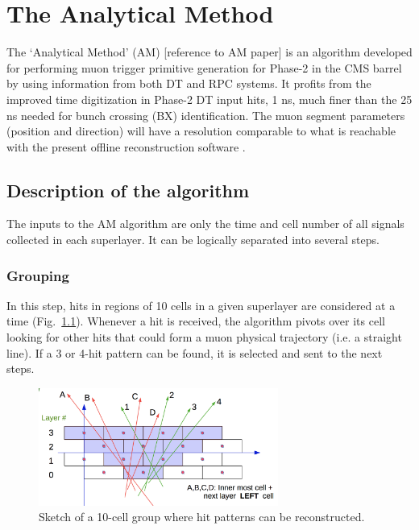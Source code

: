 \documentclass[../main.tex]{subfiles}
\begin{document}
\chapter{The Analytical Method}


The `Analytical Method' (AM) [reference to AM paper] is an algorithm developed for performing muon trigger primitive generation for Phase-2 in the CMS barrel by using information from both DT and RPC systems. It profits from the improved time digitization in Phase-2 DT input hits, 1 ns, much finer than the 25 ns needed for bunch crossing (BX) identification. The muon segment parameters (position and direction) will have a resolution comparable to what is reachable with the present offline reconstruction software \cite{dts:performance_offline}.

\section{Description of the algorithm}
\label{sec:dts:description}

The inputs to the AM algorithm are only the time and cell number of all signals collected in each superlayer. It can be logically separated into several steps.

\subsection{Grouping}

In this step, hits in regions of 10 cells in a given superlayer are considered at a time (Fig.~\ref{dts:fig:triangle}). Whenever a hit is received, the algorithm pivots over its cell looking for other hits that could form a muon physical trajectory (i.e. a straight line). If a 3 or 4-hit pattern can be found, it is selected and sent to the next steps.

\begin{figure}[h!]
\begin{center}
\includegraphics[width=0.7\textwidth]{Images/triangle.png}
\end{center}
\caption{Sketch of a 10-cell group where hit patterns can be reconstructed.}
\label{dts:fig:triangle}
\end{figure}
\end{document}

